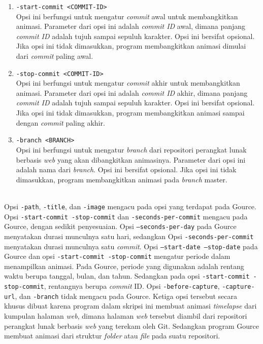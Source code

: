 \begin{enumerate}

\item \texttt{-start-commit <COMMIT-ID>}\\
Opsi ini berfungsi untuk mengatur \textit{commit} awal untuk membangkitkan animasi. Parameter dari opsi ini adalah \textit{commit ID} awal, dimana panjang \textit{commit ID} adalah tujuh sampai sepuluh karakter. Opsi ini bersifat opsional. Jika opsi ini tidak dimasukkan, program membangkitkan animasi dimulai dari \textit{commit} paling awal.
\item \texttt{-stop-commit <COMMIT-ID>}\\
Opsi ini berfungsi untuk mengatur \textit{commit} akhir untuk membangkitkan animasi. Parameter dari opsi ini adalah \textit{commit ID} akhir, dimana panjang \textit{commit ID} adalah tujuh sampai sepuluh karakter. Opsi ini bersifat opsional. Jika opsi ini tidak dimasukkan, program membangkitkan animasi sampai dengan \textit{commit} paling akhir.

\item \texttt{-branch <BRANCH>}\\
Opsi ini berfungsi untuk mengatur \textit{branch} dari repositori perangkat lunak berbasis \textit{web} yang akan dibangkitkan animasinya. Parameter dari opsi ini adalah nama dari \textit{branch}. Opsi ini bersifat opsional. Jika opsi ini tidak dimasukkan, program membangkitkan animasi pada \textit{branch} master.
\end{enumerate}
\ \\
Opsi \texttt{-path}, \texttt{-title}, dan \texttt{-image} mengacu pada opsi yang terdapat pada Gource. Opsi \texttt{-start-commit -stop-commit} dan \texttt{-seconds-per-commit} mengacu pada Gource, dengan sedikit penyesuaian.  Opsi \texttt{--seconds-per-day} pada Gource menyatakan durasi munculnya satu hari, sedangkan Opsi \texttt{-seconds-per-commit} menyatakan durasi munculnya satu \textit{commit}. Opsi \texttt{--start-date --stop-date} pada Gource dan opsi \texttt{-start-commit -stop-commit} mengatur periode dalam menampilkan animasi. Pada Gource, periode yang digunakan adalah rentang waktu berupa tanggal, bulan, dan tahun. Sedangkan pada opsi \texttt{-start-commit -stop-commit}, rentangnya berupa \textit{commit} ID. Opsi \texttt{-before-capture}, \texttt{-capture-url}, dan \texttt{-branch} tidak mengacu pada Gource. Ketiga opsi tersebut secara khusus dibuat karena program dalam skripsi ini membuat animasi \textit{timelapse} dari kumpulan halaman \textit{web}, dimana halaman \textit{web} tersebut diambil dari repositori perangkat lunak berbasis \textit{web} yang terekam oleh Git. Sedangkan program Gource membuat animasi dari struktur \textit{folder} atau \textit{file} pada suatu repositori.            
  
